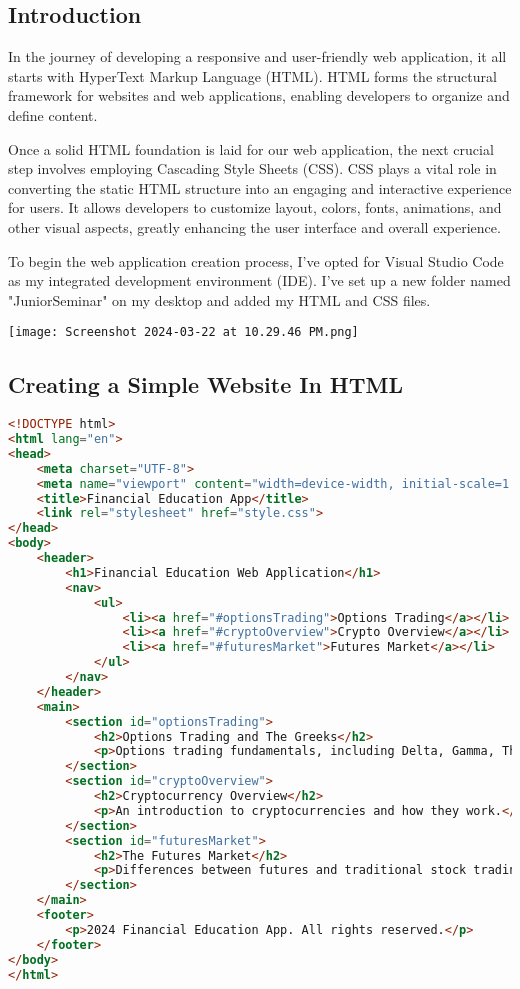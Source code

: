 \documentclass[10pt,twocolumn]{article}
\begin{document}
\subsection{Introduction}

In the journey of developing a responsive and user-friendly web application, it all starts with HyperText Markup Language (HTML). HTML forms the structural framework for websites and web applications, enabling developers to organize and define content.

Once a solid HTML foundation is laid for our web application, the next crucial step involves employing Cascading Style Sheets (CSS). CSS plays a vital role in converting the static HTML structure into an engaging and interactive experience for users. It allows developers to customize layout, colors, fonts, animations, and other visual aspects, greatly enhancing the user interface and overall experience.

To begin the web application creation process, I've opted for Visual Studio Code as my integrated development environment (IDE). I've set up a new folder named "JuniorSeminar" on my desktop and added my HTML and CSS files.


\centering
\texttt{[image: Screenshot 2024-03-22 at 10.29.46 PM.png]}



\subsection{Creating a Simple Website In HTML}

\begin{lstlisting}[language=HTML, caption={HTML Document}, label=lst:htmlcode]
<!DOCTYPE html>
<html lang="en">
<head>
    <meta charset="UTF-8">
    <meta name="viewport" content="width=device-width, initial-scale=1.0">
    <title>Financial Education App</title>
    <link rel="stylesheet" href="style.css">
</head>
<body>
    <header>
        <h1>Financial Education Web Application</h1>
        <nav>
            <ul>
                <li><a href="#optionsTrading">Options Trading</a></li>
                <li><a href="#cryptoOverview">Crypto Overview</a></li>
                <li><a href="#futuresMarket">Futures Market</a></li>
            </ul>
        </nav>
    </header>
    <main>
        <section id="optionsTrading">
            <h2>Options Trading and The Greeks</h2>
            <p>Options trading fundamentals, including Delta, Gamma, Theta, and Vega.</p>
        </section>
        <section id="cryptoOverview">
            <h2>Cryptocurrency Overview</h2>
            <p>An introduction to cryptocurrencies and how they work.</p>
        </section>
        <section id="futuresMarket">
            <h2>The Futures Market</h2>
            <p>Differences between futures and traditional stock trading.</p>
        </section>
    </main>
    <footer>
        <p>2024 Financial Education App. All rights reserved.</p>
    </footer>
</body>
</html>
\end{lstlisting}
\end{document}
